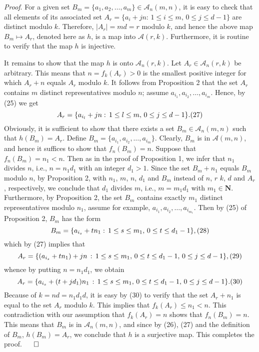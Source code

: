 \documentclass[12pt]{amsart}
\begin{document}
{{\it Proof}. 
For a given set $B_m=\{a_1,a_2,\ldots,a_m\}\in {\mathcal A}_n(m,n)$,
it is easy to check  that all elements
of its  associated set $A_r=\{a_i+jn:\, 1\le i\le m,\, 
0\le j\le d-1\}$ are distinct modulo $k$. Therefore, $|A_r|=md=r$ modulo $k$,
and hence the above map $B_m\mapsto A_r$, denoted here as $h$, 
 is a map into ${\mathcal A}(r,k)$.
Furthermore,  it is routine to verify that the map $h$  is injective.

It remains to show that the map $h$ is onto ${\mathcal A}_n(r,k)$.
Let $A_r\in {\mathcal A}_n(r,k)$ be  arbitrary. 
This means that $n=f_k(A_r)>0$ is the 
smallest positive integer for
which $A_r+n$ equals $A_r$ modulo $k$.  It follows from Proposition 2  that 
the set $A_r$ contains  $m$ distinct representatives modulo $n$; assume  
$a_{i_1}, a_{i_2},\ldots, a_{i_{m}}$. Hence, by (25) we get
 $$
A_r=\{a_{i_l}+jn :\, 1\le l\le m,\, 0\le j\le d-1\}.
\relax(27)  
 $$
Obviously, it is sufficient to show that there exists a set 
$B_m\in {\mathcal A}_n(m,n)$ such that $h(B_m)=A_r$. 
Define $B_m=\{a_{i_1},a_{i_2},\ldots,a_{i_m}\}$. 
Clearly, $B_m$ is in ${\mathcal A}(m,n)$,
and hence it suffices to show that $f_n(B_m)=n$. Suppose that 
$f_n(B_m)=n_1<n$. 
Then as in  the proof of Proposition 1,  we infer that $n_1$ divides $n$, 
i.e., $n=n_1d_1$ with an integer $d_1>1$.
Since the set $B_m+n_1$ equals $B_m$ modulo $n$,   
by  Proposition 2, with $n_1$, $m$, $n$,  $d_1$ and $B_m$ instead of 
$n$, $r$ $k$, $d$ and $A_r$, respectively, we conclude that 
$d_1$ divides $m$, i.e., $m=m_1d_1$ with  $m_1\in\mathbf{N}$. Furthermore, 
by Proposition 2, the set $B_m$ contains exactly $m_1$ distinct 
representatives modulo $n_1$,  assume for example, 
$a_{i_1}, a_{i_2},\ldots, a_{i_{m_1}}$. Then by (25)  of 
Proposition 2, $B_m$ has the form
     $$
B_m=\{a_{i_s}+tn_1 :\, 1\le s\le m_1,\, 0\le t\le d_1-1\},\relax(28)  
 $$
which by (27) implies that 
$$
A_r=\{(a_{i_s}+tn_1)+jn\, :\, 1\le s\le m_1,\, 0\le t\le d_1-1,\,
0\le j\le d-1\},  \relax(29)
 $$
whence by putting $n=n_1d_1$, we obtain
  $$
A_r=\{a_{i_s}+(t+jd_1)n_1 \,:\, 1\le s\le m_1,\, 0\le t\le d_1-1,\,
0\le j\le d-1\}.  \relax(30)
 $$
Because of  $k=nd=n_1d_1d$, it is easy by (30) to verify that the 
set $A_r+n_1$ is equal to the set $A_r$  modulo $k$. This implies that 
$f_k(A_r)\le n_1<n$. This contradiction 
with our assumption that $f_k(A_r)=n$ shows that $f_n(B_m)=n$. This means that
$B_m$ is in ${\mathcal A}_n(m,n)$, and since by (26), (27) and the definition 
of $B_m$, $h(B_m)=A_r$, we conclude that $h$ is a surjective map.
This  completes the proof.
\hfill$\qed$

}
\end{document}
